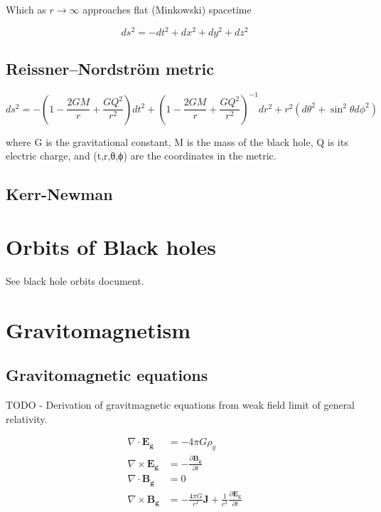 Which as $r\rightarrow \infty$ approaches flat (Minkowski) spacetime

\begin{equation}
    ds^2 = - dt^2 + dx^2 + dy^2 + dz^2
\label{eq:Minkowski metruc}
\end{equation}

\subsection{Reissner–Nordström metric}
\begin{equation}
    ds^2 = -\left(1 - \frac{{2GM}}{{r}} + \frac{{GQ^2}}{{r^2}}\right)dt^2 + \left(1 - \frac{{2GM}}{{r}} + \frac{{GQ^2}}{{r^2}}\right)^{-1}dr^2 + r^2(d\theta^2 + \sin^2\theta d\phi^2)
\end{equation}

where G is the gravitational constant, M is the mass of the black hole, Q is its electric charge, and (t,r,θ,ϕ) are the coordinates in the metric.

\subsection{Kerr-Newman}

\section{Orbits of Black holes}\label{sec:Orbits}

See black hole orbits document.

\section{Gravitomagnetism}\label{sec:Gravitomagnetism}

\subsection{Gravitomagnetic equations}

TODO - Derivation of gravitmagnetic equations from weak field limit of general relativity.

\begin{align}\label{eq:Gravitomagnetic equations}
    \nabla \cdot \mathbf{E_g} &= - 4\pi G \rho_g \\
    \nabla \times \mathbf{E_g} &= - \frac{\partial \mathbf{B_g}}{\partial t}\label{eq:Gravitomag grad E} \\
    \nabla \cdot \mathbf{B_g} &= 0 \\
    \nabla \times \mathbf{B_g} &= - \frac{4\pi G}{c^2} \mathbf{J} + \frac{1}{c^2} \frac{\partial \mathbf{E_g}}{\partial t}\label{eq:Gravitomag Partial E}
\end{align}

